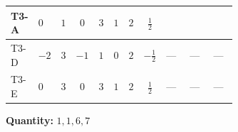 \documentclass[8pt]{article}
\begin{document}
\begin{landscape}
\begin{longtable}{@{}llcccccc >{\raggedright\arraybackslash}p{0.21\linewidth} >{\raggedright\arraybackslash}p{0.21\linewidth} >{\raggedright\arraybackslash}p{0.21\linewidth}@{}}
\midrule
T3-A & $0$ & $1$ & $0$ & $3$ & $1$ & $2$ & $\frac{1}{2}$ & \scriptsize\adjustbox{max width=\linewidth}{$\begin{gathered} \frac{3^{\frac{3}{4}} i lambda12Inv1 \overline{y_{1}} \overline{y_{2}}}{6 MF}\end{gathered}$} & \scriptsize\adjustbox{max width=\linewidth}{$\begin{gathered} \frac{3^{\frac{3}{4}} i g_{1}^{2} \overline{y_{1}} \overline{y_{2}}}{8 MF}\end{gathered}$} & \scriptsize\adjustbox{max width=\linewidth}{$\begin{gathered} \frac{11 \cdot 3^{\frac{3}{4}} i g_{2}^{2} \overline{y_{1}} \overline{y_{2}}}{8 MF}\end{gathered}$} \\
\midrule
T3-D & $-2$ & $3$ & $-1$ & $1$ & $0$ & $2$ & $-\frac{1}{2}$ & --- & --- & --- \\
\midrule
T3-E & $0$ & $3$ & $0$ & $3$ & $1$ & $2$ & $\frac{1}{2}$ & --- & --- & --- \\
\midrule
\bottomrule
\end{longtable}
\clearpage
\noindent\textbf{Quantity: }$\mathrm{1,1,6,7}$\par\smallskip

\end{landscape}
\end{document}
